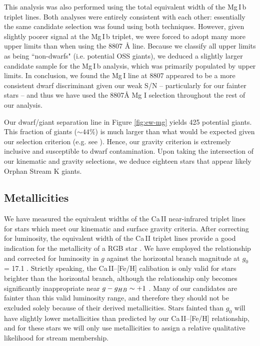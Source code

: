 \documentclass{emulateapj}
\begin{document}
This analysis was also performed using the total equivalent width of the Mg\,\textsc{I}\,b triplet lines. Both analyses were entirely consistent with each other: essentially the same candidate selection was found using both techniques. However, given slightly poorer signal at the Mg\,\textsc{I}\,b triplet, we were forced to adopt many more upper limits than when using the 8807 {\AA} line. Because we classify all upper limits as being ``non-dwarfs" (i.e. potential OSS giants), we deduced a slightly larger candidate sample for the Mg\,\textsc{I}\,b analysis, which was primarily populated by upper limits. In conclusion, we found the Mg\,\textsc{I} line at 8807 appeared to be a more consistent dwarf discriminant given our weak S/N \--- particularly for our fainter stars \--- and thus we have used the 8807{\AA} Mg \textsc{I} selection throughout the rest of our analysis.

Our dwarf/giant separation line in Figure \ref{fig:ew-mg} yields 425 potential giants. This fraction of giants ($\sim{}44\%$) is much larger than what would be expected given our selection criterion (e.g. see \citet{Casey;et-al_2012a}). Hence, our gravity criterion is extremely inclusive and susceptible to dwarf contamination. Upon taking the intersection of our kinematic and gravity selections, we deduce eighteen stars that appear likely Orphan Stream K giants.


\subsection{Metallicities}
\label{sec:metallicities}

We have measured the equivalent widths of the Ca\,\textsc{II} near-infrared triplet lines for stars which meet our kinematic and surface gravity criteria. After correcting for luminosity, the equivalent width of the Ca\,\textsc{II} triplet lines provide a good indication for the metallicity of a RGB star \citep{Amandroff;Da_Costa_1991}. We have employed the \citet{Starkenburg;et-al_2010} relationship and corrected for luminosity in $g$ against the horizontal branch magnitude at $g_0$ = 17.1 \citep{Newberg;et-al_2010}. Strictly speaking, the Ca\,\textsc{II}\---[Fe/H] calibation is only valid for stars brighter than the horizontal branch, although the relationship only becomes significantly inappropriate near $g \-- g_{HB} \sim +1$ \citep{Saviane;et-al_2012}. Many of our candidates are fainter than this valid luminosity range, and therefore they should not be excluded solely because of their derived metallicities. Stars fainted than $g_0$ will have slightly lower metallicities than predicted by our Ca\,\textsc{II}\---[Fe/H] relationship, and for these stars we will only use metallicities to assign a relative qualitative likelihood for stream membership.
\end{document}

